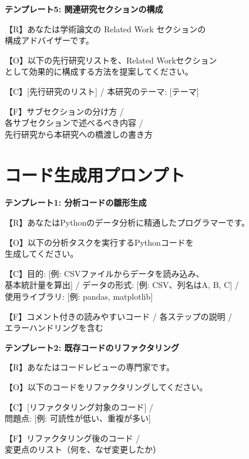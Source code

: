 \begin{promptbox}
\textbf{テンプレート5: 関連研究セクションの構成}

【R】あなたは学術論文の Related Work セクションの\\
構成アドバイザーです。

【O】以下の先行研究リストを、Related Workセクション\\
として効果的に構成する方法を提案してください。

【C】[先行研究のリスト] / 本研究のテーマ: [テーマ]

【F】サブセクションの分け方 /\\
各サブセクションで述べるべき内容 /\\
先行研究から本研究への橋渡しの書き方
\end{promptbox}

\section{コード生成用プロンプト}

\begin{promptbox}
\textbf{テンプレート1: 分析コードの雛形生成}

【R】あなたはPythonのデータ分析に精通したプログラマーです。

【O】以下の分析タスクを実行するPythonコードを\\
生成してください。

【C】目的: [例: CSVファイルからデータを読み込み、\\
基本統計量を算出] / データの形式: [例: CSV、列名はA, B, C] /\\
使用ライブラリ: [例: pandas, matplotlib]

【F】コメント付きの読みやすいコード / 各ステップの説明 /\\
エラーハンドリングを含む
\end{promptbox}

\begin{promptbox}
\textbf{テンプレート2: 既存コードのリファクタリング}

【R】あなたはコードレビューの専門家です。

【O】以下のコードをリファクタリングしてください。

【C】[リファクタリング対象のコード] /\\
問題点: [例: 可読性が低い、重複が多い]

【F】リファクタリング後のコード /\\
変更点のリスト（何を、なぜ変更したか）
\end{promptbox}

